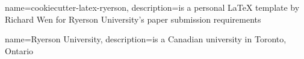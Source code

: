 

\makeglossaries
{}


{
	name={cookiecutter-latex-ryerso}n,
	description={is a personal LaTeX template by Richard Wen for Ryerson University's paper submission requirements}
}

{
	name={Ryerson University},
	description={is a Canadian university in Toronto, Ontario}
}
